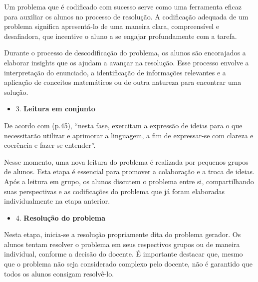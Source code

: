 Um problema que é codificado com sucesso serve como uma ferramenta eficaz para auxiliar os alunos no processo de resolução. A codificação adequada de um problema significa apresentá-lo de uma maneira clara, compreensível e desafiadora, que incentive o aluno a se engajar profundamente com a tarefa.

Durante o processo de descodificação do problema, os alunos são encorajados a elaborar insights que os ajudam a avançar na resolução. Esse processo envolve a interpretação do enunciado, a identificação de informações relevantes e a aplicação de conceitos matemáticos ou de outra natureza para encontrar uma solução.


\begin{itemize}
    \item 3. \textbf{Leitura em conjunto}
\end{itemize}

De acordo com  (p.45), ``nesta fase, exercitam a expressão de ideias para o que necessitarão utilizar e aprimorar a linguagem, a fim de expressar-se com clareza e coerência e fazer-se entender''.

Nesse momento, uma nova leitura do problema é realizada por pequenos grupos de alunos. Esta etapa é essencial para promover a colaboração e a troca de ideias. Após a leitura em grupo, os alunos discutem o problema entre si, compartilhando suas perspectivas e as codificações do problema que já foram elaboradas individualmente na etapa anterior.


\begin{itemize}
    \item 4. \textbf{Resolução do problema}
\end{itemize}

Nesta etapa, inicia-se a resolução propriamente dita do problema gerador. Os alunos tentam resolver o problema em seus respectivos grupos ou de maneira individual, conforme a decisão do docente. É importante destacar que, mesmo que o problema não seja considerado complexo pelo docente, não é garantido que todos os alunos consigam resolvê-lo.

